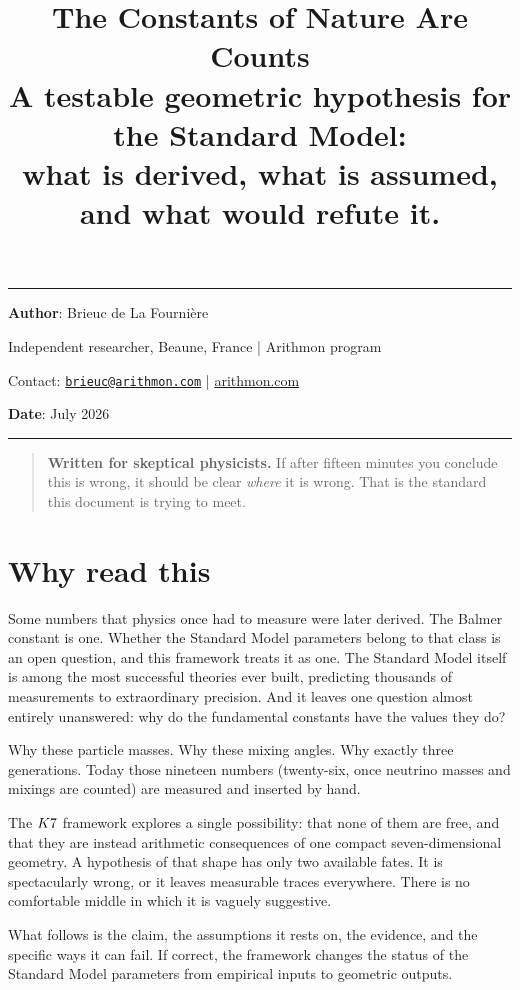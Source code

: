\documentclass[11pt,a4paper]{article}
\title{%
\LARGE\textbf{The Constants of Nature Are Counts}\\[0.45em]
\large A testable geometric hypothesis for the Standard Model:\\[0.15em]
\normalsize what is derived, what is assumed, and what would refute it.%
}
\author{}
\date{}
\begin{document}
\maketitle
\noindent\rule{\textwidth}{0.2pt}

\noindent\textbf{Author}: Brieuc de La Fourni\`ere

\noindent Independent researcher, Beaune, France \quad | \quad Arithmon program

\noindent Contact: \href{mailto:brieuc@arithmon.com}{\texttt{brieuc@arithmon.com}} \quad | \quad \href{https://arithmon.com}{arithmon.com}

\noindent\textbf{Date}: July 2026

\noindent\rule{\textwidth}{0.2pt}

\begin{quote}
\textbf{Written for skeptical physicists.} If after fifteen minutes you
conclude this is wrong, it should be clear \emph{where} it is wrong. That
is the standard this document is trying to meet.
\end{quote}

\section{Why read this}

Some numbers that physics once had to measure were later derived. The
Balmer constant is one. Whether the Standard Model parameters belong to
that class is an open question, and this framework treats it as one. The
Standard Model itself is among the most successful theories ever built,
predicting thousands of measurements to extraordinary precision. And it
leaves one question almost entirely unanswered: why do the fundamental
constants have the values they do?

Why these particle masses. Why these mixing angles. Why exactly three
generations. Today those nineteen numbers (twenty-six, once neutrino masses
and mixings are counted) are measured and inserted by hand.

The $K7$ framework explores a single possibility: that none of them
are free, and that they are instead arithmetic consequences of one compact
seven-dimensional geometry. A hypothesis of that shape has only two
available fates. It is spectacularly wrong, or it leaves measurable traces
everywhere. There is no comfortable middle in which it is vaguely
suggestive.

What follows is the claim, the assumptions it rests on, the evidence, and
the specific ways it can fail. If correct, the framework changes the status
of the Standard Model parameters from empirical inputs to geometric
outputs.
\end{document}
